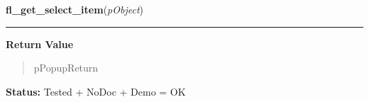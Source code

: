     \vspace{0.5ex}

\hspace{.8\funcindent}\begin{boxedminipage}{\funcwidth}

    \raggedright \textbf{fl\_get\_select\_item}(\textit{pObject})

    \vspace{-1.5ex}

    \rule{\textwidth}{0.5\fboxrule}
\setlength{\parskip}{2ex}
\setlength{\parskip}{1ex}
      \textbf{Return Value}
    \vspace{-1ex}

      \begin{quote}
      pPopupReturn

      \end{quote}

\textbf{Status:} Tested + NoDoc + Demo = OK



    \end{boxedminipage}

    \label{xformslib:library:fl_set_select_item}

    \vspace{0.5ex}

